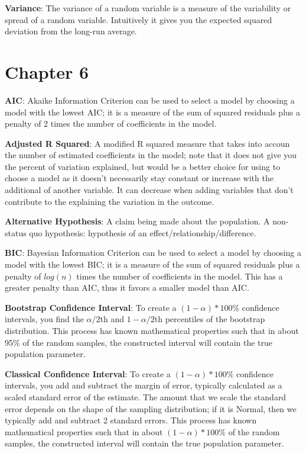 \documentclass[]{book}
\begin{document}
\textbf{Variance}: The variance of a random variable is a measure of the variability or spread of a random variable. Intuitively it gives you the expected squared deviation from the long-run average.

\hypertarget{chapter-6}{%
\section{Chapter 6}\label{chapter-6}}

\textbf{AIC}: Akaike Information Criterion can be used to select a model by choosing a model with the lowest AIC; it is a measure of the sum of squared residuals plus a penalty of 2 times the number of coefficients in the model.

\textbf{Adjusted R Squared}: A modified R squared measure that takes into accoun the number of estimated coefficients in the model; note that it does not give you the percent of variation explained, but would be a better choice for using to choose a model as it doesn't necessarily stay constant or increase with the additional of another variable. It can decrease when adding variables that don't contribute to the explaining the variation in the outcome.

\textbf{Alternative Hypothesis}: A claim being made about the population. A non-status quo hypothesis: hypothesis of an effect/relationship/difference.

\textbf{BIC}: Bayesian Information Criterion can be used to select a model by choosing a model with the lowest BIC; it is a measure of the sum of squared residuals plus a penalty of \(log(n)\) times the number of coefficients in the model. This has a greater penalty than AIC, thus it favors a smaller model than AIC.

\textbf{Bootstrap Confidence Interval}: To create a \((1-\alpha)*100\%\) confidence intervals, you find the \(\alpha/2\)th and \(1-\alpha/2\)th percentiles of the bootstrap distribution. This process has known mathematical properties such that in about 95\% of the random samples, the constructed interval will contain the true population parameter.

\textbf{Classical Confidence Interval}: To create a \((1-\alpha)*100\%\) confidence intervals, you add and subtract the margin of error, typically calculated as a scaled standard error of the estimate. The amount that we scale the standard error depends on the shape of the sampling distribution; if it is Normal, then we typically add and subtract 2 standard errors. This process has known mathematical properties such that in about \((1-\alpha)*100\%\) of the random samples, the constructed interval will contain the true population parameter.
\end{document}

